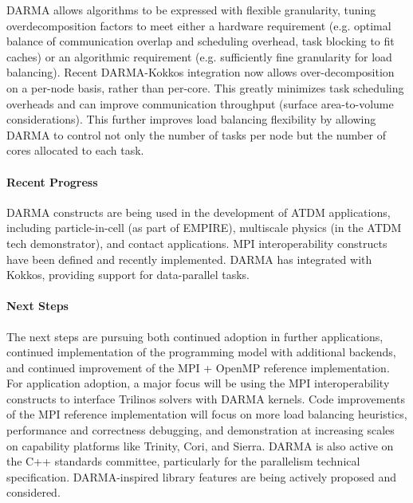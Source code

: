 DARMA allows algorithms to be expressed with flexible granularity, tuning overdecomposition factors to meet either a hardware requirement (e.g. optimal balance of communication overlap and scheduling overhead, task blocking to fit caches) or an algorithmic requirement (e.g. sufficiently fine granularity for load balancing).
Recent DARMA-Kokkos integration now allows over-decomposition on a per-node basis, rather than per-core.
This greatly minimizes task scheduling overheads and can improve communication throughput (surface area-to-volume considerations).
This further improves load balancing flexibility by allowing DARMA to control not only the number of tasks per node but the number of cores allocated to each task.

\paragraph{Recent Progress}
DARMA constructs are being used in the development of ATDM applications, including particle-in-cell (as part of EMPIRE), multiscale physics (in the ATDM tech demonstrator), and contact applications.  MPI interoperability constructs have been defined and recently implemented. DARMA has integrated with Kokkos, providing support for data-parallel tasks.

\paragraph{Next Steps}
The next steps are pursuing both continued adoption in further applications, continued implementation of the programming model with additional backends, and continued improvement of the MPI + OpenMP reference implementation.
For application adoption, a major focus will be using the MPI interoperability constructs to interface Trilinos solvers with DARMA kernels.
Code improvements of the MPI reference implementation will focus on more load balancing heuristics, performance and correctness debugging, and demonstration at increasing scales on capability platforms like Trinity, Cori, and Sierra.
DARMA is also active on the C++ standards committee, particularly for the parallelism technical specification. DARMA-inspired library features are being actively proposed and considered.